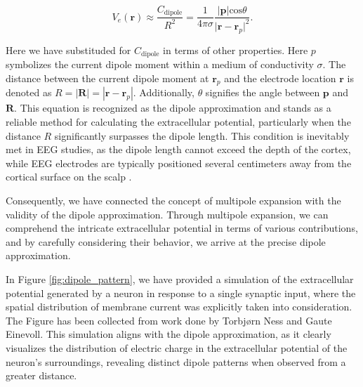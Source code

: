 \documentclass[a4paper, UKenglish, 11pt]{uiomaster}
\begin{document}
\begin{equation}
V_e(\textbf{r}) \approx \frac{C_{\text{dipole}}}{R^2} = \frac{1}{4\pi\sigma}\frac{|\textbf{p}| \text{cos} \theta}{\lvert\textbf{r}-\textbf{r}_p\rvert^2}.
\label{eq:extracellular_potential_approximation}
\end{equation}

Here we have substituded for $C_\text{dipole}$ in terms of other properties. Here $p$ symbolizes the current dipole moment within a medium of conductivity $\sigma$. The distance between the current dipole moment at $\textbf{r}_p$ and the electrode location $\textbf{r}$ is denoted as $R = |\textbf{R}| = |\textbf{r} - \textbf{r}_p|$. Additionally, $\theta$ signifies the angle between $\textbf{p}$ and $\textbf{R}$. This equation is recognized as the dipole approximation and stands as a reliable method for calculating the extracellular potential, particularly when the distance $R$ significantly surpasses the dipole length. This condition is inevitably met in EEG studies, as the dipole length cannot exceed the depth of the cortex, while EEG electrodes are typically positioned several centimeters away from the cortical surface on the scalp \cite{naess2021biophysically}.

Consequently, we have connected the concept of multipole expansion with the validity of the dipole approximation. Through multipole expansion, we can comprehend the intricate extracellular potential in terms of various contributions, and by carefully considering their behavior, we arrive at the precise dipole approximation.

In Figure \ref{fig:dipole_pattern}, we have provided a simulation of the extracellular potential generated by a neuron in response to a single synaptic input, where the spatial distribution of membrane current was explicitly taken into consideration. The Figure has been collected from work done by Torbjørn Ness and Gaute Einevoll. This simulation aligns with the dipole approximation, as it clearly visualizes the distribution of electric charge in the extracellular potential of the neuron's surroundings, revealing distinct dipole patterns when observed from a greater distance.
\end{document}
